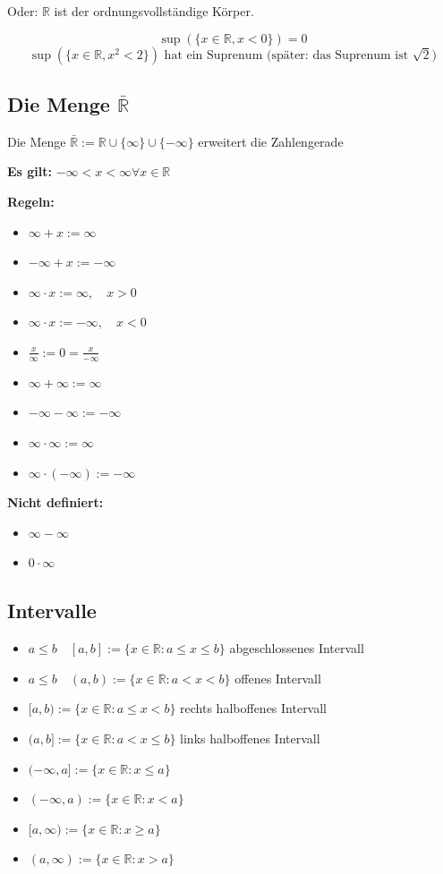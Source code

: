 \documentclass[fleqn]{scrbook}
\newcommand{\R}{\mathbb{R}}
\newenvironment{example}{{\bfseries Beispiel }}{}
\begin{document}
Oder: $\R$ ist der ordnungsvollständige Körper.

\begin{example}
\[\sup(\{x \in \R, x < 0\}) = 0\]
\[\sup(\{x \in \R, x^2 < 2\}) \text{ hat ein Suprenum (später: das Suprenum ist } \sqrt{2} \text{)}\]
\end{example}

\subsection{Die Menge \texorpdfstring{$\bar{\R}$}{R}}

Die Menge $\bar{\R}:= \R \cup \{\infty\} \cup \{-\infty\}$ erweitert die Zahlengerade

\textbf{Es gilt:} $-\infty < x < \infty \forall x \in \R$

\textbf{Regeln:}

\begin{itemize}
  \item $\infty + x := \infty$
  \item $-\infty + x := -\infty$
  \item $\infty  \cdot  x := \infty, \quad x>0$
  \item $\infty  \cdot  x := -\infty, \quad x<0$
  \item $\frac{x}{\infty}:=0=\frac{x}{-\infty}$
  \item $\infty + \infty := \infty$
  \item $-\infty - \infty := -\infty$
  \item $\infty  \cdot  \infty := \infty$
  \item $\infty  \cdot  (-\infty) := -\infty$
\end{itemize}

\textbf{Nicht definiert:}

\begin{itemize}
  \item $\infty-\infty$
  \item $0 \cdot \infty$
\end{itemize}

\subsection{Intervalle}

\begin{itemize}
  \item $a \leq b \quad [a,b] := \{x \in \R:a \leq x \leq b\}$ abgeschlossenes Intervall
  \item $a \leq b \quad (a,b) := \{x \in \R:a < x < b\}$ offenes Intervall
  \item $[a,b) := \{x \in \R:a \leq x < b\}$ rechts halboffenes Intervall
  \item $(a,b]:= \{x \in \R:a < x \leq b\}$ links halboffenes Intervall
  \item $(-\infty,a]:= \{x \in \R:x \leq a\}$
  \item $(-\infty,a):= \{x \in \R:x < a\}$
  \item $[a,\infty):= \{x \in \R:x \geq a\}$
  \item $(a,\infty):= \{x \in \R:x > a\}$
\end{itemize}
\end{document}
